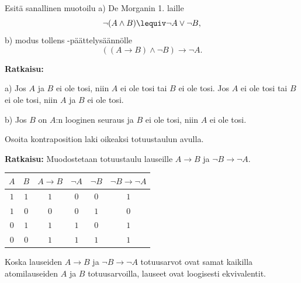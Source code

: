 \bigskip

\begin{esimerkki}
Esitä  sanallinen muotoilu a) De Morganin 1. laille
\[
\lnot (A\land B) \lequiv \lnot A \lor \lnot B,
\]
b) modus tollens -päättelysäännölle
\[
((A\to B)\land \lnot B) \to \lnot A.
\]

{\bf Ratkaisu:}

a) Jos $A$ ja $B$ ei ole tosi, niin $A$ ei ole tosi tai $B$ ei ole tosi. Jos $A$ ei ole tosi tai $B$ ei ole tosi, niin $A$ ja $B$ ei ole tosi.

b) Jos $B$ on $A$:n looginen seuraus ja $B$ ei ole tosi, niin $A$ ei ole tosi.
\end{esimerkki}


\begin{esimerkki}
Osoita kontraposition laki oikeaksi totuustaulun avulla.

{\bf Ratkaisu:} 
Muodostetaan totuustaulu lauseille  $A\to B$  ja  $\lnot B \to \lnot A$.

\bigskip

\begin{center}

\begin{tabular}{|c|c|c|c|c|c|}\hline
$A$ & $B$ &  $A\to B$ & $\lnot A$  & $\lnot B$ & $\lnot B \to \lnot A$ \\ \hline
$1$ & $1$ & $1$ & $0$ & $0$ & $1$\\ 
$1$ & $0$ & $0$ & $0$ & $1$ & $0$\\
$0$ & $1$ & $1$ & $1$ & $0$ & $1$\\
$0$ & $0$ & $1$ & $1$ & $1$ & $1$\\ \hline
\end{tabular}

\end{center}

\bigskip

Koska lauseiden $A\to B$ ja $\lnot B \to \lnot A$ totuusarvot ovat samat kaikilla atomilauseiden $A$ ja $B$ totuusarvoilla, lauseet ovat loogisesti ekvivalentit.
\end{esimerkki}



